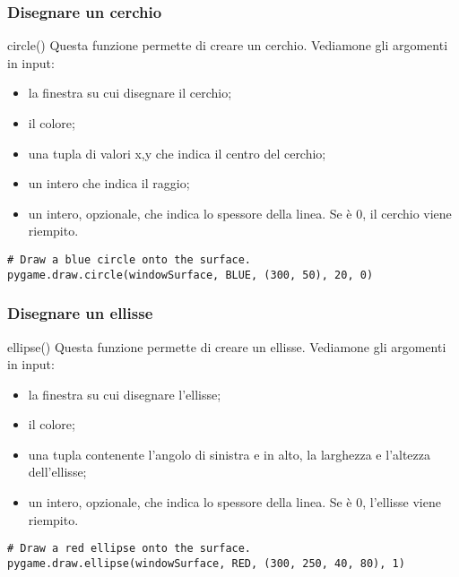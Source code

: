 \documentclass{beamer}
\begin{document}
\begin{frame}[fragile]
\frametitle{Disegnare un cerchio}
\begin{block}{circle()}
	Questa funzione permette di creare un cerchio. Vediamone gli argomenti in input:
	\begin{itemize}
		\item la finestra su cui disegnare il cerchio;
		\item il colore;
		\item una tupla di valori x,y che indica il centro del cerchio;
		\item un intero che indica il raggio;
		\item un intero, opzionale, che indica lo spessore della linea. Se è 0, il cerchio viene riempito.
	\end{itemize}
\end{block}
\begin{lstlisting}
# Draw a blue circle onto the surface.
pygame.draw.circle(windowSurface, BLUE, (300, 50), 20, 0)

\end{lstlisting}
\end{frame}

\begin{frame}[fragile]
\frametitle{Disegnare un ellisse}
\begin{block}{ellipse()}
	Questa funzione permette di creare un ellisse. Vediamone gli argomenti in input:
	\begin{itemize}
		\item la finestra su cui disegnare l'ellisse;
		\item il colore;
		\item una tupla contenente l'angolo di sinistra e in alto, la larghezza e l'altezza dell'ellisse;
		\item un intero, opzionale, che indica lo spessore della linea. Se è 0, l'ellisse viene riempito.
	\end{itemize}
\end{block}
\begin{lstlisting}
# Draw a red ellipse onto the surface.
pygame.draw.ellipse(windowSurface, RED, (300, 250, 40, 80), 1)

\end{lstlisting}
\end{frame}
\end{document}
